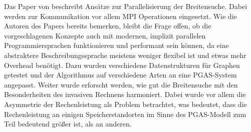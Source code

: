Das Paper von \cite{Buluc:2011} beschreibt Ansätze zur Parallelisierung der Breitensuche. Dabei werden zur Kommunikation vor allem MPI Operationen eingesetzt. Wie die Autoren des Papers bereits bemerken, bleibt die Frage offen, ob die vorgeschlagenen Konzepte auch mit modernen, implizit parallelen Programmiersprachen funktionieren und performant sein können, da eine abstraktere Beschreibungssprache meistens weniger flexibel ist und etwas mehr Overhead benötigt. Dazu wurden verschiedene Datenstrukturen für Graphen getestet und der Algorithmus auf verschiedene Arten an eine PGAS-System angepasst. Weiter wurde erforscht werden, wie gut die Breitensuche mit den Besonderheiten des invasiven Rechnens harmoniert. Dabei wurde vor allem die Asymmetrie der Rechenleistung als Problem betrachtet, was bedeutet, dass die Rechenleistung an einigen Speicherstandorten im Sinne des PGAS-Modell zum Teil bedeutend größer ist, als an anderen.


